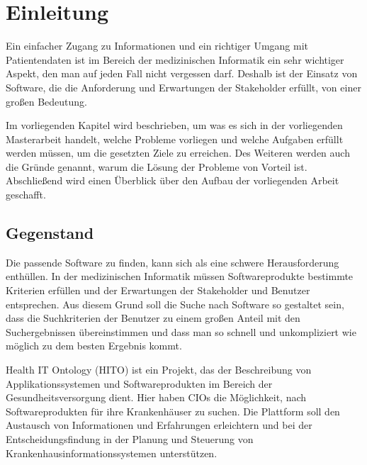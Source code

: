\chapter{Einleitung}\label{ch:introduction}

Ein einfacher Zugang zu Informationen und ein richtiger Umgang mit Patientendaten ist im Bereich der medizinischen Informatik ein sehr wichtiger Aspekt, den man auf jeden Fall nicht vergessen darf. Deshalb ist der Einsatz von Software, die die Anforderung und Erwartungen der Stakeholder erfüllt, von einer großen Bedeutung.

Im vorliegenden Kapitel wird beschrieben, um was es sich in der vorliegenden Masterarbeit handelt, welche Probleme vorliegen und welche Aufgaben erfüllt werden müssen, um die gesetzten Ziele zu erreichen. Des Weiteren werden auch die Gründe genannt, warum die Lösung der Probleme von Vorteil ist. Abschließend wird einen Überblick über den Aufbau der vorliegenden Arbeit geschafft.

\section{Gegenstand}\label{sec:gegenstand}

Die passende Software zu finden, kann sich als eine schwere Herausforderung enthüllen. In der medizinischen Informatik müssen Softwareprodukte bestimmte Kriterien erfüllen und der Erwartungen der Stakeholder und Benutzer entsprechen. Aus diesem Grund soll die Suche nach Software so gestaltet sein, dass die Suchkriterien der Benutzer zu einem großen Anteil mit den Suchergebnissen übereinstimmen und dass man so schnell und unkompliziert wie möglich zu dem besten Ergebnis kommt. 

Health IT Ontology (HITO) ist ein Projekt, das der Beschreibung von Applikationssystemen und Softwareprodukten im Bereich der Gesundheitsversorgung dient. Hier haben CIOs die Möglichkeit, nach Softwareprodukten für ihre Krankenhäuser zu suchen. Die Plattform soll den Austausch von Informationen und Erfahrungen erleichtern und bei der Entscheidungsfindung in der Planung und Steuerung von Krankenhausinformationssystemen unterstützen.

